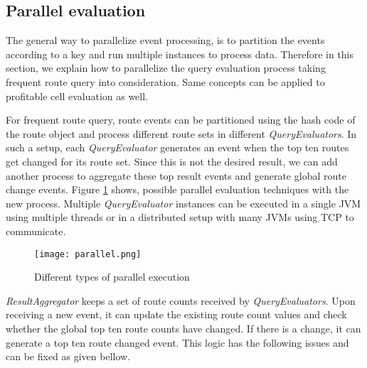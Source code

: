 \subsection{Parallel evaluation}
The general way to parallelize event processing, is to partition the events according to a key and run multiple instances to process data. Therefore in this section, we explain how to parallelize the query evaluation process taking frequent route query into consideration. Same concepts can be applied to profitable cell evaluation as well.

For frequent route query, route events can be partitioned using the hash code of the route object and process different route sets in different \textit{QueryEvaluators}. In such a setup, each \textit{QueryEvaluator} generates an event when the top ten routes get changed for its route set. Since this is not the desired result, we can add another process to aggregate these top result events and generate global route change events. Figure \ref{parallel} shows, possible parallel evaluation techniques with the new process. Multiple \textit{QueryEvaluator} instances can be executed in a single JVM using multiple threads or in a distributed setup with many JVMs using TCP to communicate. 

\begin{figure}[!t]
        \centering
        \texttt{[image: parallel.png]}
        \caption{Different types of parallel execution}
        \label{parallel}
\end{figure}

\textit{ResultAggregator} keeps a set of route counts received by \textit{QueryEvaluators}. Upon receiving a new event, it can update the existing route count values and check whether the global top ten route counts have changed. If there is a change, it can generate a top ten route changed event. This logic has the following issues and can be fixed as given bellow.

